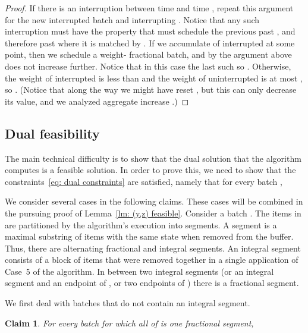 \documentclass[12pt]{article}
\newtheorem{claim}[theorem]{Claim}
\begin{document}
\begin{proof}
If there is an interruption between time  and time ,
repeat this argument for the new interrupted batch  and
interrupting . Notice that any such interruption must
have the property that  must schedule the previous  
past , and therefore past where it is matched by .
If we accumulate  of
interrupted  at some point, then we schedule a 
weight- fractional batch, and by the argument above
 does not increase further. Notice that in this
case the last such  so .
Otherwise, the weight
of interrupted  is less than  and the weight
of uninterrupted  is at most , so
. (Notice that along the way we
might have reset , but this can only decrease its
value, and we analyzed aggregate increase .)
\end{proof}


\subsection{Dual feasibility}

The main technical difficulty is to show that the dual solution that the
algorithm computes is a feasible solution.
In order to prove this, we need to show that
the constraints~\eqref{eq: dual constraints} are satisfied, namely that
for every batch ,

We consider several cases in the following claims. These cases will be
combined in the pursuing proof of Lemma~\ref{lm: (y,z) feasible}.
Consider a batch . The items in  are partitioned by the
algorithm's execution into segments. A segment is a maximal
substring of items with the same state when removed from the
buffer. Thus, there are alternating fractional and integral segments.
An integral segment consists of a block of items that were removed
together in a single application of Case~5 of the algorithm. In
between two integral segments (or an integral segment and an
endpoint of , or two endpoints of ) there is a fractional
segment.

We first deal with batches that do not contain an integral
segment.
\begin{claim}\label{cl: fractional batch}
For every batch  for which all of  is one fractional segment,

\end {claim}
\end{document}
